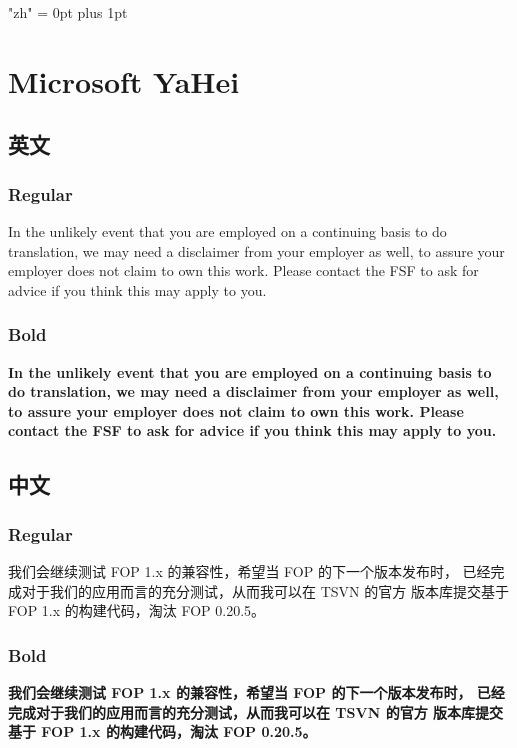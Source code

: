 \documentclass[a4paper,12pt]{report}
\begin{document}
\XeTeXlinebreaklocale "zh"
\XeTeXlinebreakskip = 0pt plus 1pt

\chapter{Microsoft YaHei}

\section{英文}
  \subsection{Regular}
    In the unlikely event that you are employed on a continuing basis to do
    translation, we may need a disclaimer from your employer as well, to assure
    your employer does not claim to own this work.  Please contact the FSF to
    ask for advice if you think this may apply to you.
  \subsection{Bold}
    {\bf In the unlikely event that you are employed on a continuing basis to do
    translation, we may need a disclaimer from your employer as well, to assure
    your employer does not claim to own this work.  Please contact the FSF to
    ask for advice if you think this may apply to you.}

\section{中文}
  \subsection{Regular}
  我们会继续测试 FOP 1.x 的兼容性，希望当 FOP 的下一个版本发布时，
  已经完成对于我们的应用而言的充分测试，从而我可以在 TSVN 的官方
  版本库提交基于 FOP 1.x 的构建代码，淘汰 FOP 0.20.5。
  \subsection{Bold}
  {\bf 我们会继续测试 FOP 1.x 的兼容性，希望当 FOP 的下一个版本发布时，
  已经完成对于我们的应用而言的充分测试，从而我可以在 TSVN 的官方
  版本库提交基于 FOP 1.x 的构建代码，淘汰 FOP 0.20.5。}
\end{document}
